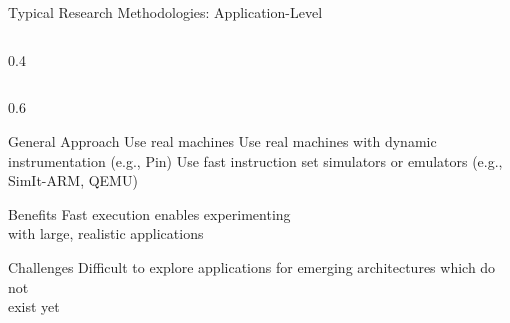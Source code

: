 
\section[{\it Presentation} Overview]{}

\begin{frame}[t]{Typical Research Methodologies: Application-Level}
\begin{cbxcols}

  \begin{column}{0.4\tw}
  \end{column}

  \begin{column}{0.6\tw}
    \vspace{-0.05in}
    \begin{cbxlist}

      \1 General Approach
         \2 Use real machines
         \2 Use real machines with dynamic instrumentation (e.g., Pin)
         \2 Use fast instruction set simulators or emulators (e.g.,
            SimIt-ARM, QEMU)

      \1 Benefits
         \2 Fast execution enables experimenting \\ with large, realistic
            applications

      \1 Challenges
         \2 Difficult to explore applications for emerging architectures
            which do not \\ exist yet

    \end{cbxlist}
  \end{column}

\end{cbxcols}
\end{frame}

